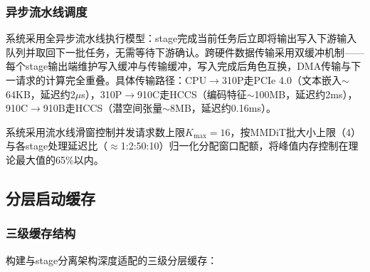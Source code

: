 \documentclass{ctexart}
\begin{document}
\subsubsection{异步流水线调度}

系统采用全异步流水线执行模型：stage完成当前任务后立即将输出写入下游输入队列并取回下一批任务，无需等待下游确认。跨硬件数据传输采用双缓冲机制——每个stage输出端维护写入缓冲与传输缓冲，写入完成后角色互换，DMA传输与下一请求的计算完全重叠。具体传输路径：CPU$\rightarrow$310P走PCIe 4.0（文本嵌入$\sim$64KB，延迟约2$\mu$s），310P$\rightarrow$910C走HCCS（编码特征$\sim$100MB，延迟约2ms），910C$\rightarrow$910B走HCCS（潜空间张量$\sim$8MB，延迟约0.16ms）。

系统采用流水线滑窗控制并发请求数上限$K_{\text{max}}=16$，按MMDiT批大小上限（4）与各stage处理延迟比（$\approx$1:2:50:10）归一化分配窗口配额，将峰值内存控制在理论最大值的65\%以内。
\subsection{分层启动缓存}

\subsubsection{三级缓存结构}

构建与stage分离架构深度适配的三级分层缓存：
\end{document}
